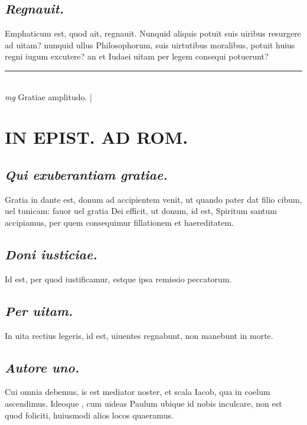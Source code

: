 \documentclass{article}
\begin{document}
\begin{pages}
\subsection*{\textit{Regnauit. }}\pstart Emphaticum est, quod ait, regnauit. Nunquid aliquis potuit suis uiribus resurgere ad uitam? nunquid ullus Philosophorum, suis uirtutibus moralibus, potuit huius regni iugum excutere? an et Iudaei uitam per legem consequi potuerunt?  \pend
\vspace{0.5cm}\noindent
\vspace{0.2cm}\rule{1cm}{0.2pt}\\ 
\hspace{0.2cm}\textit{mg}
\footnotesize Gratiae amplitudo. 
\normalsize| 
\section*{IN EPIST. AD ROM.  }
\marginpar{[ p.55 ]}
{}
\subsection*{\textit{Qui exuberantiam gratiae. }}\pstart Gratia in dante est, donum ad accipientem venit, ut quando pater dat filio cibum, uel tunicam: fauor uel gratia Dei efficit, ut donum, id est, Spiritum santum accipiamus, per quem consequimur fillationem et haereditatem.   \pend
{}
{}
\subsection*{\textit{Doni iusticiae. }}\pstart Id est, per quod iustificamur, estque ipsa remissio peccatorum.   \pend
{}
{}
\subsection*{\textit{Per uitam. }}\pstart In uita rectius legeris, id est, uiuentes regnabunt, non manebunt in morte.   \pend
{}
{}
\subsection*{\textit{Autore uno. }}\pstart Cui omnia debemus, is est mediator noster, et scala Iacob, qua in coelum ascendimus. Ideoque , cum uideas Paulum ubique id nobis inculcare, non est quod foliciti, huiusmodi alios locos quaeramus.   \pend
{}
{}

\end{pages}
\end{document}
